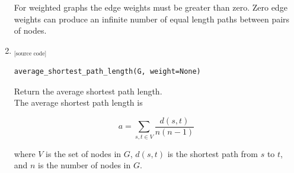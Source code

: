 \documentclass{article}
\begin{document}
\begin{enumerate}
\par For weighted graphs the edge weights must be greater than zero. Zero edge weights can produce an infinite number of equal length paths between pairs of nodes.



\item 
\href{https://networkx.github.io/documentation/networkx-1.11/reference/generated/networkx.algorithms.shortest_paths.generic.average_shortest_path_length.html?highlight=average%20shortest%20path%20length}{\text{average\_shortest\_path\_length}} \href{https://networkx.github.io/documentation/networkx-1.11/_modules/networkx/algorithms/shortest_paths/generic.html#average_shortest_path_length}{$_{\text{[source code]}}$}
\begin{lstlisting}
average_shortest_path_length(G, weight=None)
\end{lstlisting}


Return the average shortest path length.\\

The average shortest path length is

$$a=\sum_{s,t \in V} \frac{d(s,t)}{n(n−1)}$$

where $V$ is the set of nodes in $G$, $d(s,t)$ is the shortest path from $s$ to $t$, and $n$ is the number of nodes in $G$.

\end{enumerate}
\end{document}
